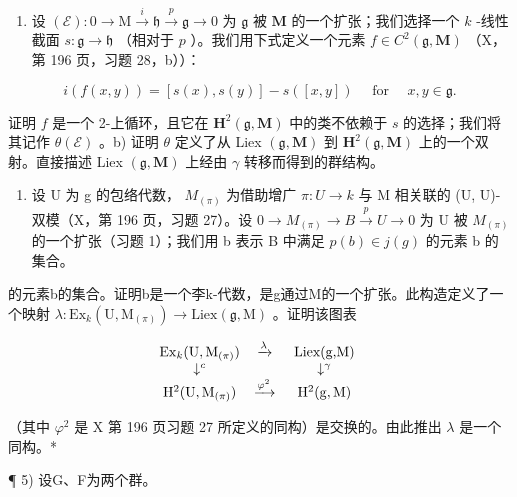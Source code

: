 \begin{enumerate}
\def\labelenumi{\alph{enumi})}
\tightlist
\item
  设 \((\mathcal{E}):0\to \mathrm{M}\stackrel {i}{\to}\mathfrak{h}\stackrel {p}{\to}\mathfrak{g}\to 0\) 为 \(\mathfrak{g}\) 被 \(\mathbf{M}\) 的一个扩张；我们选择一个 \(k\) -线性截面 \(s:\mathfrak{g}\to \mathfrak{h}\) （相对于 \(p\) ）。我们用下式定义一个元素 \(f\in C^2 (\mathfrak{g},\mathbf{M})\) （X，第 196 页，习题 28，b））：
\end{enumerate}

\[
i (f (x, y)) = [ s (x), s (y) ] - s ([ x , y ]) \quad \text { for } \quad x  ,   y \in \mathfrak {g}  .
\]

证明 \(f\) 是一个 2-上循环，且它在 \(\mathbf{H}^{2}(\mathfrak{g},\mathbf{M})\) 中的类不依赖于 \(s\) 的选择；我们将其记作 \(\theta(\mathcal{E})\) 。b) 证明 \(\theta\) 定义了从 Liex \((\mathfrak{g},\mathbf{M})\) 到 \(\mathbf{H}^{2}(\mathfrak{g},\mathbf{M})\) 上的一个双射。直接描述 Liex \((\mathfrak{g},\mathbf{M})\) 上经由 \(\gamma\) 转移而得到的群结构。

\begin{enumerate}
\def\labelenumi{\alph{enumi})}
\setcounter{enumi}{2}
\tightlist
\item
  设 U 为 g 的包络代数， \(M_{(\pi)}\) 为借助增广 \(\pi: U \to k\) 与 M 相关联的 (U, U)-双模（X，第 196 页，习题 27）。设 \(0 \to M_{(\pi)} \to B \xrightarrow{p} U \to 0\) 为 U 被 \(M_{(\pi)}\) 的一个扩张（习题 1）；我们用 b 表示 B 中满足 \(p(b) \in j(g)\) 的元素 b 的集合。
\end{enumerate}

的元素b的集合。证明b是一个李k-代数，是g通过M的一个扩张。此构造定义了一个映射 \(\lambda: \mathrm{Ex}_{k}(\mathrm{U}, \mathrm{M}_{(\pi)}) \to \mathrm{Liex}(\mathfrak{g}, \mathrm{M})\) 。证明该图表

\[
\begin{array}{c c c} \operatorname{Ex} _ {k} (\mathrm{U}, \mathrm{M} _ {(\pi)}) & \xrightarrow {\lambda} & \text { Liex(g,M) } \\ \downarrow^ {c} & & \downarrow^ {\gamma} \\ \mathrm{H} ^ {2} (\mathrm{U}, \mathrm{M} _ {(\pi)}) & \xrightarrow {\varphi^ {2}} & \mathrm{H} ^ {2} (\mathrm{g,M}) \end{array}
\]

（其中 \(\varphi^2\) 是 X 第 196 页习题 27 所定义的同构）是交换的。由此推出 \(\lambda\) 是一个同构。*

¶ 5) 设G、F为两个群。

